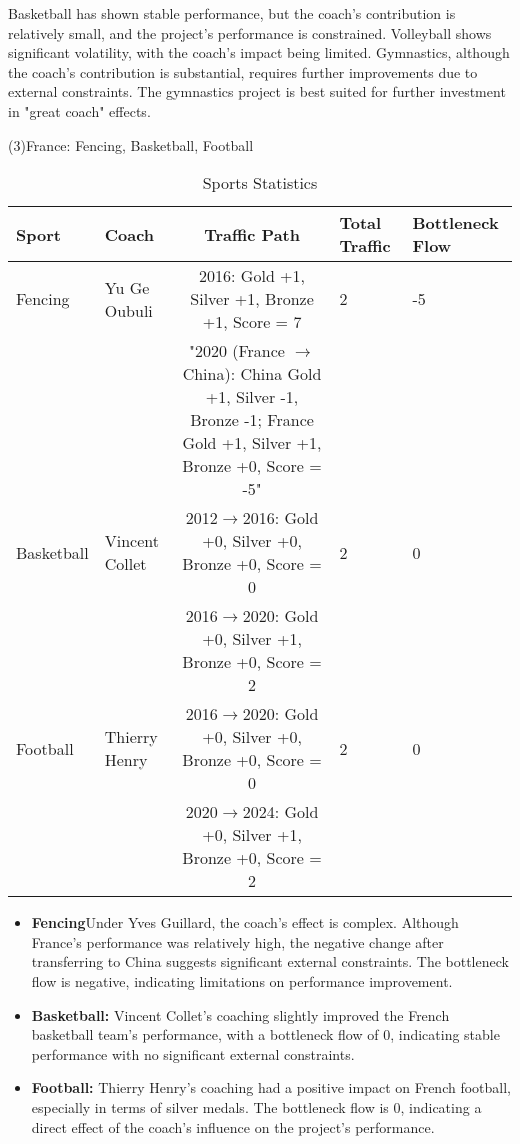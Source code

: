 \documentclass{mcmthesis}
\begin{document}
    Basketball has shown stable performance, but the coach’s contribution is relatively small, and the project’s performance is constrained. Volleyball shows significant volatility, with the coach’s impact being limited. Gymnastics, although the coach’s contribution is substantial, requires further improvements due to external constraints. The gymnastics project is best suited for further investment in "great coach" effects.

    (3)France: Fencing, Basketball, Football
    \begin{table}[ht]
        \centering
        \begin{tabular}{|p{2cm}|p{1.5cm}|c|p{1cm}|p{2cm}|}
        \hline
        Sport & Coach & Traffic Path & Total Traffic & Bottleneck Flow \\
        \hline
        Fencing & Yu Ge Oubuli & 2016: Gold +1, Silver +1, Bronze +1, Score = 7 & 2 & -5 \\
         & & "2020 (France $\to$ China): China Gold +1, Silver -1, Bronze -1; France Gold +1, Silver +1, Bronze +0, Score = -5" & & \\
        \hline
        Basketball & Vincent Collet & 2012$\to$2016: Gold +0, Silver +0, Bronze +0, Score = 0 & 2 & 0 \\
         & & 2016$\to$2020: Gold +0, Silver +1, Bronze +0, Score = 2 & & \\
        \hline
        Football & Thierry Henry & 2016$\to$2020: Gold +0, Silver +0, Bronze +0, Score = 0 & 2 & 0 \\
         & & 2020$\to$2024: Gold +0, Silver +1, Bronze +0, Score = 2 & & \\
        \hline
        \end{tabular}
        \caption{Sports Statistics}
    \end{table}

    \begin{itemize}
        \item {\bf Fencing}Under Yves Guillard, the coach's effect is complex. Although France's performance was relatively high, the negative change after transferring to China suggests significant external constraints. The bottleneck flow is negative, indicating limitations on performance improvement.
        \item {\bf Basketball: }Vincent Collet’s coaching slightly improved the French basketball team’s performance, with a bottleneck flow of 0, indicating stable performance with no significant external constraints.
        \item {\bf Football: } Thierry Henry’s coaching had a positive impact on French football, especially in terms of silver medals. The bottleneck flow is 0, indicating a direct effect of the coach’s influence on the project’s performance.
    \end{itemize}
\end{document}
